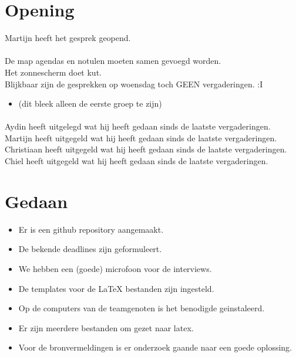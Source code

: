 \documentclass[dutch]{hu}
\subtitle{Samenvatting Voortgangsgesprek 2}
\date{18-11-2015}
\begin{document}
	\maketitle
	
	\section{Opening}
	Martijn heeft het gesprek geopend.
	\paragraph{}
	De map agendas en notulen moeten samen gevoegd worden.\\
	Het zonnescherm doet kut.\\
	Blijkbaar zijn de gesprekken op woensdag toch GEEN vergaderingen. :I
	\begin{itemize}
		\item (dit bleek alleen de eerste groep te zijn)
	\end{itemize}
	\paragraph{}
	Aydin heeft uitgelegd wat hij heeft gedaan sinds de laatste vergaderingen.\\
	Martijn heeft uitgegeld wat hij heeft gedaan sinds de laatste vergaderingen.\\
	Christiaan heeft uitgegeld wat hij heeft gedaan sinds de laatste vergaderingen.\\
	Chiel heeft uitgegeld wat hij heeft gedaan sinds de laatste vergaderingen.
	
	\section{Gedaan}
	\begin{itemize}	
		\item Er is een github repository aangemaakt.
		\item De bekende deadlines zijn geformuleert.
		\item We hebben een (goede) microfoon voor de interviews.
		\item De templates voor de LaTeX bestanden zijn ingesteld.
		\item Op de computers van de teamgenoten is het benodigde geinstaleerd.
		\item Er zijn meerdere bestanden om gezet naar latex.
		\item Voor de bronvermeldingen is er onderzoek gaande naar een goede oplossing.
	\end{itemize}
	
\end{document}
